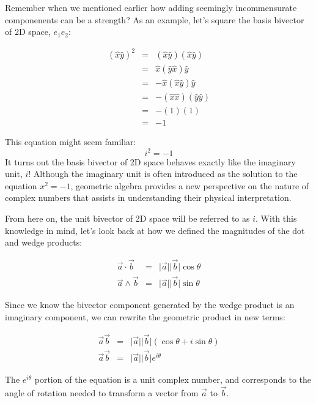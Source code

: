 Remember when we mentioned earlier how adding seemingly incommensurate componenents can be a
strength? As an example, let's square the basis bivector of 2D space, $e_{1}e_{2}$:

\begin{eqnarray*}
    \left(\hat{x}\hat{y}\right)^{2} &=& \left(\hat{x}\hat{y}\right)\left(\hat{x}\hat{y}\right) \\
    &=& \hat{x}\left(\hat{y}\hat{x}\right)\hat{y} \\
    &=& -\hat{x}\left(\hat{x}\hat{y}\right)\hat{y} \\
    &=& -\left(\hat{x}\hat{x}\right)\left(\hat{y}\hat{y}\right) \\
    &=& -\left(1\right)\left(1\right) \\
    &=& -1
\end{eqnarray*}

This equation might seem familiar: $$i^{2} = -1$$ It turns out the basis bivector of 2D space 
behaves exactly like the imaginary unit, $i$! Although the imaginary unit is often introduced as 
the solution to the equation $x^2 = -1$, geometric algebra provides a new perspective on the
nature of complex numbers that assists in understanding their physical interpretation.

From here on, the unit bivector of 2D space will be referred to as $i$. With this knowledge in
mind, let's look back at how we defined the magnitudes of the dot and wedge products:

\begin{eqnarray*}
    \vec{a} \cdot \vec{b} &=& \lvert\vec{a}\rvert \lvert\vec{b}\rvert \cos\theta \\
    \vec{a} \wedge \vec{b} &=& \lvert\vec{a}\rvert \lvert\vec{b}\rvert \sin\theta
\end{eqnarray*}

Since we know the bivector component generated by the wedge product is an imaginary component, we 
can rewrite the geometric product in new terms:

\begin{eqnarray*}
    \vec{a}\vec{b} &=& \lvert\vec{a}\rvert \lvert\vec{b}\rvert
    \left(\cos\theta + i\sin\theta\right)\\
    \vec{a}\vec{b} &=& \lvert\vec{a}\rvert \lvert\vec{b}\rvert e^{i\theta}
\end{eqnarray*}

The $e^{i\theta}$ portion of the equation is a unit complex number, and corresponds to the angle of
rotation needed to transform a vector from $\vec{a}$ to $\vec{b}$. 

